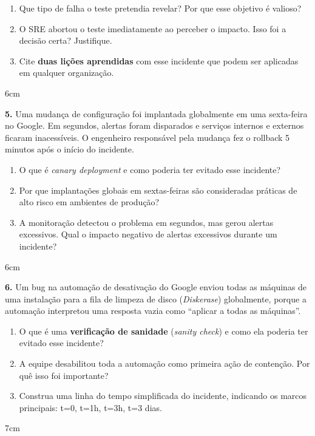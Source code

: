 \documentclass[12pt,a4paper]{report}
\begin{document}
\begin{enumerate}[label=\alph*)]
  \item Que tipo de falha o teste pretendia revelar? Por que esse objetivo é valioso?
  \item O SRE abortou o teste imediatamente ao perceber o impacto. Isso foi a decisão
        certa? Justifique.
  \item Cite \textbf{duas lições aprendidas} com esse incidente que podem ser aplicadas
        em qualquer organização.
\end{enumerate}
\begin{resposta}{6cm}
\end{resposta}

\vspace{0.5cm}

\textbf{5.} Uma mudança de configuração foi implantada globalmente em uma sexta-feira
no Google. Em segundos, alertas foram disparados e serviços internos e externos ficaram
inacessíveis. O engenheiro responsável pela mudança fez o rollback 5 minutos após o
início do incidente.

\begin{enumerate}[label=\alph*)]
  \item O que é \textit{canary deployment} e como poderia ter evitado esse incidente?
  \item Por que implantações globais em sextas-feiras são consideradas práticas de
        alto risco em ambientes de produção?
  \item A monitoração detectou o problema em segundos, mas gerou alertas excessivos.
        Qual o impacto negativo de alertas excessivos durante um incidente?
\end{enumerate}
\begin{resposta}{6cm}
\end{resposta}

\vspace{0.5cm}

\textbf{6.} Um bug na automação de desativação do Google enviou todas as máquinas de
uma instalação para a fila de limpeza de disco (\textit{Diskerase}) globalmente, porque a
automação interpretou uma resposta vazia como ``aplicar a todas as máquinas''.

\begin{enumerate}[label=\alph*)]
  \item O que é uma \textbf{verificação de sanidade} (\textit{sanity check}) e como ela
        poderia ter evitado esse incidente?
  \item A equipe desabilitou toda a automação como primeira ação de contenção. Por quê
        isso foi importante?
  \item Construa uma linha do tempo simplificada do incidente, indicando os marcos
        principais: t=0, t=1h, t=3h, t=3 dias.
\end{enumerate}
\begin{resposta}{7cm}
\end{resposta}
\end{document}
